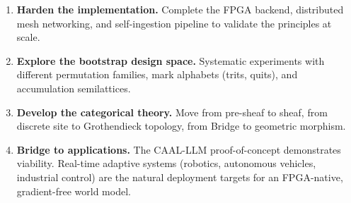 \documentclass[11pt,a4paper]{article}
\theoremstyle{remark}
\begin{document}
\begin{enumerate}[leftmargin=*,nosep]
  \item \textbf{Harden the implementation.} Complete the FPGA backend, distributed mesh
    networking, and self-ingestion pipeline to validate the principles at scale.
  \item \textbf{Explore the bootstrap design space.} Systematic experiments with
    different permutation families, mark alphabets (trits, quits), and accumulation
    semilattices.
  \item \textbf{Develop the categorical theory.} Move from pre-sheaf to sheaf, from
    discrete site to Grothendieck topology, from Bridge to geometric morphism.
  \item \textbf{Bridge to applications.} The CAAL-LLM proof-of-concept demonstrates
    viability. Real-time adaptive systems (robotics, autonomous vehicles, industrial
    control) are the natural deployment targets for an FPGA-native, gradient-free world
    model.
\end{enumerate}

\end{document}
